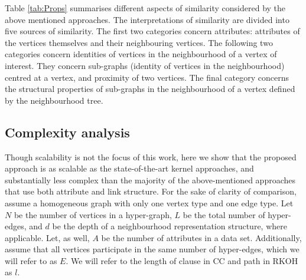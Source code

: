 Table \ref{tab:Props} summarises different aspects of similarity considered by the above mentioned approaches.
The interpretations of similarity are divided into five sources of similarity.
The first two categories concern attributes: attributes of the vertices themselves and their neighbouring vertices.
The following two categories concern identities of vertices in the neighbourhood of a vertex of interest.
They concern sub-graphs (identity of vertices in the neighbourhood) centred at a vertex, and proximity of two vertices.
The final category concerns the structural properties of sub-graphs in the neighbourhood of a vertex defined by the neighbourhood tree.


\subsection{Complexity analysis}

Though scalability is not the focus of this work, here we show that the proposed approach is as scalable as the state-of-the-art kernel approaches, and substantially less complex than the majority of the above-mentioned approaches that use both attribute and link structure.
For the sake of clarity of comparison, assume a homogeneous graph with only one vertex type and one edge type.
Let $N$ be the number of vertices in a hyper-graph, $L$ be the total number of hyper-edges, and $d$ be the depth of a neighbourhood representation structure, where applicable.
Let, as well, $A$ be the number of attributes in a data set.
Additionally, assume that all vertices participate in the same number of hyper-edges, which we will refer to as $E$.
We will refer to the length of clause in CC and path in RKOH as $l$.



